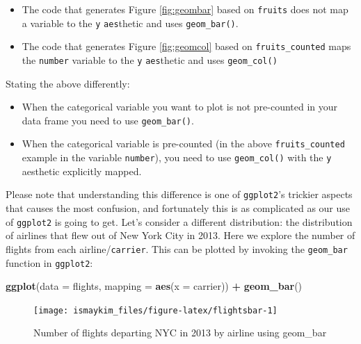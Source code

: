 \documentclass[12pt,]{krantz}
\makeatletter
\newenvironment{Shaded}{\begin{snugshade}}{\end{snugshade}}
\newcommand{\KeywordTok}[1]{\textcolor[rgb]{0.27,0.27,0.27}{\textbf{#1}}}
\newcommand{\DataTypeTok}[1]{\textcolor[rgb]{0.27,0.27,0.27}{#1}}
\newcommand{\StringTok}[1]{\textcolor[rgb]{0.5,0.5,0.5}{#1}}
\newcommand{\OperatorTok}[1]{\textcolor[rgb]{0.43,0.43,0.43}{\textbf{#1}}}
\newcommand{\NormalTok}[1]{#1}
\providecommand{\tightlist}{%
  \setlength{\itemsep}{0pt}\setlength{\parskip}{0pt}}
\newenvironment{kframe}{%
\medskip{}
\setlength{\fboxsep}{.8em}
 \def\at@end@of@kframe{}%
 \ifinner\ifhmode%
  \def\at@end@of@kframe{\end{minipage}}%
  \begin{minipage}{\columnwidth}%
 \fi\fi%
 \def\FrameCommand##1{\hskip\@totalleftmargin \hskip-\fboxsep
 \colorbox{shadecolor}{##1}\hskip-\fboxsep
     \hskip-\linewidth \hskip-\@totalleftmargin \hskip\columnwidth}%
 \MakeFramed {\advance\hsize-\width
   \@totalleftmargin\z@ \linewidth\hsize
   \@setminipage}}%
 {\par\unskip\endMakeFramed%
 \at@end@of@kframe}
\renewenvironment{Shaded}{\begin{kframe}}{\end{kframe}}
\theoremstyle{definition}
\theoremstyle{definition}
\theoremstyle{definition}
\theoremstyle{remark}
\makeatother
\begin{document}
\begin{itemize}
\tightlist
\item
  The code that generates Figure \ref{fig:geombar} based on
  \texttt{fruits} does not map a variable to the \texttt{y}
  \texttt{aes}thetic and uses \texttt{geom\_bar()}.
\item
  The code that generates Figure \ref{fig:geomcol} based on
  \texttt{fruits\_counted} maps the \texttt{number} variable to the
  \texttt{y} \texttt{aes}thetic and uses \texttt{geom\_col()}
\end{itemize}

Stating the above differently:

\begin{itemize}
\tightlist
\item
  When the categorical variable you want to plot is not pre-counted in
  your data frame you need to use \texttt{geom\_bar()}.
\item
  When the categorical variable is pre-counted (in the above
  \texttt{fruits\_counted} example in the variable \texttt{number}), you
  need to use \texttt{geom\_col()} with the \texttt{y} aesthetic
  explicitly mapped.
\end{itemize}

Please note that understanding this difference is one of
\texttt{ggplot2}'s trickier aspects that causes the most confusion, and
fortunately this is as complicated as our use of \texttt{ggplot2} is
going to get. Let's consider a different distribution: the distribution
of airlines that flew out of New York City in 2013. Here we explore the
number of flights from each airline/\texttt{carrier}. This can be
plotted by invoking the \texttt{geom\_bar} function in \texttt{ggplot2}:




\begin{Shaded}
\begin{Highlighting}[]
\KeywordTok{ggplot}\NormalTok{(}\DataTypeTok{data =}\NormalTok{ flights, }\DataTypeTok{mapping =} \KeywordTok{aes}\NormalTok{(}\DataTypeTok{x =}\NormalTok{ carrier)) }\OperatorTok{+}
\StringTok{  }\KeywordTok{geom_bar}\NormalTok{()}
\end{Highlighting}
\end{Shaded}

\begin{figure}

{\centering \texttt{[image: ismaykim\_files/figure-latex/flightsbar-1]} 

}

\caption{Number of flights departing NYC in 2013 by airline using
geom\_bar}\label{fig:flightsbar}
\end{figure}
\end{document}
